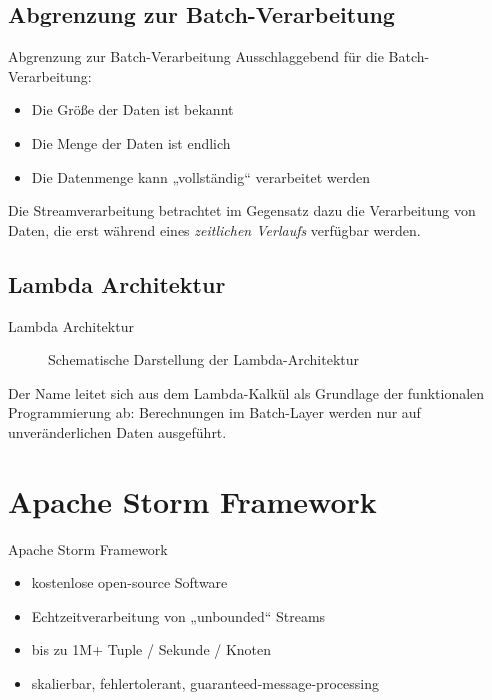 \documentclass{beamer}
\begin{document}
\subsection{Abgrenzung zur Batch-Verarbeitung}

\begin{frame}[t]{Abgrenzung zur Batch-Verarbeitung}
  Ausschlaggebend für die Batch-Verarbeitung:
  \begin{itemize}
    \item Die Größe der Daten ist bekannt
    \item Die Menge der Daten ist endlich
    \item Die Datenmenge kann „vollständig“ verarbeitet werden
  \end{itemize}
  Die Streamverarbeitung betrachtet im Gegensatz dazu die Verarbeitung
  von Daten, die erst während eines \textit{zeitlichen Verlaufs} verfügbar
  werden.

\end{frame}


\subsection{Lambda Architektur}
\begin{frame}[t]{Lambda Architektur}
\begin{figure}[h]
	\center
	\scalebox{.4}{}
	\caption{Schematische Darstellung der Lambda-Architektur}
	\label{fig:lambdaarch}
\end{figure}
  Der Name leitet sich aus dem Lambda-Kalkül als Grundlage der
  funktionalen Programmierung ab: Berechnungen im Batch-Layer werden
  nur auf unveränderlichen Daten ausgeführt.
\end{frame}

\section{Apache Storm Framework}
\begin{frame}[t]{Apache Storm Framework}
  \begin{itemize}
    \item kostenlose open-source Software
    \item Echtzeitverarbeitung von „unbounded“ Streams
    \item bis zu 1M+ Tuple / Sekunde / Knoten
    \item skalierbar, fehlertolerant, guaranteed-message-processing
  \end{itemize}
\end{frame}
\end{document}
